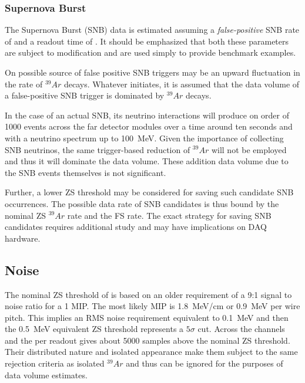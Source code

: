 \subsubsection{Supernova Burst}

The Supernova Burst (SNB) data is estimated assuming a
\textit{false-positive} SNB rate of \snbcandrate and a readout time of
\snbreadouttime.
It should be emphasized that both these parameters are subject to
modification and are used simply to provide benchmark examples.

On possible source of false positive SNB triggers may be an upward
fluctuation in the rate of $^{39}Ar$ decays.
Whatever initiates, it is assumed that the data volume of a
false-positive SNB trigger is dominated by $^{39}Ar$ decays.

In the case of an actual SNB, its neutrino interactions will produce
on order of 1000 events across the far detector modules over a time
around ten seconds and with a neutrino spectrum up to \SI{100}{\MeV}.
Given the importance of collecting SNB neutrinos, the same
trigger-based reduction of $^{39}Ar$ will not be employed and thus it
will dominate the data volume.
These addition data volume due to the SNB events themselves is not
significant.

Further, a lower ZS threshold may be considered for saving such
candidate SNB occurrences.
The possible data rate of SNB candidates is thus bound by the nominal
ZS $^{39}Ar$ rate and the FS rate.
The exact strategy for saving SNB candidates requires additional study
and may have implications on DAQ hardware.

\subsection{Noise}

The nominal ZS threshold of \chargezsthreshold is based on an older
requirement of a 9:1 signal to noise ratio for a 1 MIP.
The most likely MIP is \SI{1.8}{\MeV/\cm} or \SI{0.9}{\MeV} per wire pitch.
This implies an RMS noise requirement equivalent to \SI{0.1}{\MeV} and
then the \SI{0.5}{\MeV} equivalent ZS threshold represents a $5\sigma$ cut.
Across the \dunenumberchannels channels and the
\daqreadoutchannelsamples per readout gives about \num{5000} samples
above the nominal ZS threshold.
Their distributed nature and isolated appearance make them subject to
the same rejection criteria as isolated $^{39}Ar$ and thus can be
ignored for the purposes of data volume estimates.


